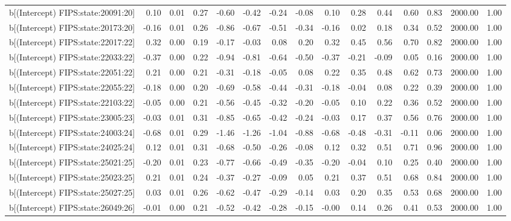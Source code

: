 \begin{table}[ht]
\begin{tabular}{rrrrrrrrrrrrrrr}
  b[(Intercept) FIPS:state:20091:20] & 0.10 & 0.01 & 0.27 & -0.60 & -0.42 & -0.24 & -0.08 & 0.10 & 0.28 & 0.44 & 0.60 & 0.83 & 2000.00 & 1.00 \\ 
  b[(Intercept) FIPS:state:20173:20] & -0.16 & 0.01 & 0.26 & -0.86 & -0.67 & -0.51 & -0.34 & -0.16 & 0.02 & 0.18 & 0.34 & 0.52 & 2000.00 & 1.00 \\ 
  b[(Intercept) FIPS:state:22017:22] & 0.32 & 0.00 & 0.19 & -0.17 & -0.03 & 0.08 & 0.20 & 0.32 & 0.45 & 0.56 & 0.70 & 0.82 & 2000.00 & 1.00 \\ 
  b[(Intercept) FIPS:state:22033:22] & -0.37 & 0.00 & 0.22 & -0.94 & -0.81 & -0.64 & -0.50 & -0.37 & -0.21 & -0.09 & 0.05 & 0.16 & 2000.00 & 1.00 \\ 
  b[(Intercept) FIPS:state:22051:22] & 0.21 & 0.00 & 0.21 & -0.31 & -0.18 & -0.05 & 0.08 & 0.22 & 0.35 & 0.48 & 0.62 & 0.73 & 2000.00 & 1.00 \\ 
  b[(Intercept) FIPS:state:22055:22] & -0.18 & 0.00 & 0.20 & -0.69 & -0.58 & -0.44 & -0.31 & -0.18 & -0.04 & 0.08 & 0.22 & 0.39 & 2000.00 & 1.00 \\ 
  b[(Intercept) FIPS:state:22103:22] & -0.05 & 0.00 & 0.21 & -0.56 & -0.45 & -0.32 & -0.20 & -0.05 & 0.10 & 0.22 & 0.36 & 0.52 & 2000.00 & 1.00 \\ 
  b[(Intercept) FIPS:state:23005:23] & -0.03 & 0.01 & 0.31 & -0.85 & -0.65 & -0.42 & -0.24 & -0.03 & 0.17 & 0.37 & 0.56 & 0.76 & 2000.00 & 1.00 \\ 
  b[(Intercept) FIPS:state:24003:24] & -0.68 & 0.01 & 0.29 & -1.46 & -1.26 & -1.04 & -0.88 & -0.68 & -0.48 & -0.31 & -0.11 & 0.06 & 2000.00 & 1.00 \\ 
  b[(Intercept) FIPS:state:24025:24] & 0.12 & 0.01 & 0.31 & -0.68 & -0.50 & -0.26 & -0.08 & 0.12 & 0.32 & 0.51 & 0.71 & 0.96 & 2000.00 & 1.00 \\ 
  b[(Intercept) FIPS:state:25021:25] & -0.20 & 0.01 & 0.23 & -0.77 & -0.66 & -0.49 & -0.35 & -0.20 & -0.04 & 0.10 & 0.25 & 0.40 & 2000.00 & 1.00 \\ 
  b[(Intercept) FIPS:state:25023:25] & 0.21 & 0.01 & 0.24 & -0.37 & -0.27 & -0.09 & 0.05 & 0.21 & 0.37 & 0.51 & 0.68 & 0.84 & 2000.00 & 1.00 \\ 
  b[(Intercept) FIPS:state:25027:25] & 0.03 & 0.01 & 0.26 & -0.62 & -0.47 & -0.29 & -0.14 & 0.03 & 0.20 & 0.35 & 0.53 & 0.68 & 2000.00 & 1.00 \\ 
  b[(Intercept) FIPS:state:26049:26] & -0.01 & 0.00 & 0.21 & -0.52 & -0.42 & -0.28 & -0.15 & -0.00 & 0.14 & 0.26 & 0.41 & 0.53 & 2000.00 & 1.00 \\ 

\end{tabular}
\end{table}
